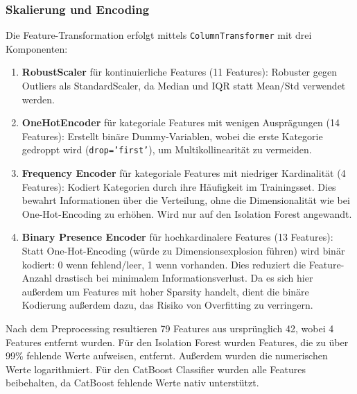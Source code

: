 \documentclass[12pt,oneside]{article}
\begin{document}
	\subsubsection{Skalierung und Encoding}
	Die Feature-Transformation erfolgt mittels \texttt{ColumnTransformer} mit drei Komponenten:
	\begin{enumerate}
		\item \textbf{RobustScaler} für kontinuierliche Features (11 Features): Robuster gegen Outliers als StandardScaler, da Median und IQR statt Mean/Std verwendet werden.
		\item \textbf{OneHotEncoder} für kategoriale Features mit wenigen Ausprägungen (14 Features): Erstellt binäre Dummy-Variablen, wobei die erste Kategorie gedroppt wird (\texttt{drop='first'}), um Multikollinearität zu vermeiden.
		\item \textbf{Frequency Encoder} für kategoriale Features mit niedriger Kardinalität (4 Features): Kodiert Kategorien durch ihre Häufigkeit im Trainingsset. Dies bewahrt Informationen über die Verteilung, ohne die Dimensionalität wie bei One-Hot-Encoding zu erhöhen. Wird nur auf den Isolation Forest angewandt.
		\item \textbf{Binary Presence Encoder} für hochkardinalere Features (13 Features): Statt One-Hot-Encoding (würde zu Dimensionsexplosion führen) wird binär kodiert: 0 wenn fehlend/leer, 1 wenn vorhanden. Dies reduziert die Feature-Anzahl drastisch bei minimalem Informationsverlust. Da es sich hier außerdem um Features mit hoher Sparsity handelt, dient die binäre Kodierung außerdem dazu, das Risiko von Overfitting zu verringern.
	\end{enumerate}
	Nach dem Preprocessing resultieren 79 Features aus ursprünglich 42, wobei 4 Features entfernt wurden. Für den Isolation Forest wurden Features, die zu über 99\% fehlende Werte aufweisen, entfernt. Außerdem wurden die numerischen Werte logarithmiert. Für den CatBoost Classifier wurden alle Features beibehalten, da CatBoost fehlende Werte nativ unterstützt.
\end{document}
